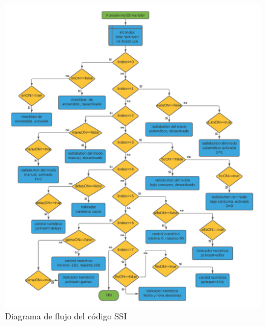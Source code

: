 \begin{figure}[H]
	\centering
	\includegraphics[width=\columnwidth]{imagenes/Diagrama SSI.png}
	\caption{Diagrama de flujo del código SSI}
	\label{fig:dia_flujSSI}
\end{figure}






\bigskip

\endinput 